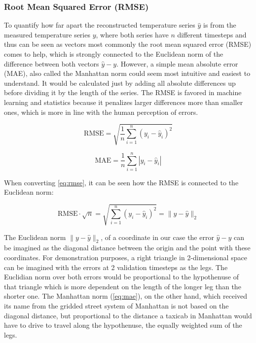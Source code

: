 \subsubsection*{Root Mean Squared Error (RMSE)}

To quantify how far apart the reconstructed temperature series $\hat{y}$ is from the measured temperature series $y$, where both series have $n$ different timesteps and thus can be seen as vectors most commonly the root mean squared error (RMSE) comes to help, which is strongly connected to the Euclidean norm of the difference between both vectors $\hat{y} - y$. However, a simple mean absolute error (MAE), also called the Manhattan norm could seem most intuitive and easiest to understand. It would be calculated just by adding all absolute differences up before dividing it by the length of the series. The RMSE is favored in machine learning and statistics because it penalizes larger differences more than smaller ones, which is more in line with the human perception of errors. 

\begin{equation}
    \text{RMSE} = \sqrt{\frac{1}{n} \sum_{i=1}^{n} (y_i - \hat{y}_i)^2}
    \label{eq:rmse}
\end{equation}

\begin{equation}
    \text{MAE} = \frac{1}{n} \sum_{i=1}^{n} |y_i - \hat{y}_i|
    \label{eq:mae}
\end{equation}

When converting \autoref*{eq:rmse}, it can be seen how the RMSE is connected to the Euclidean norm:

\begin{equation}
  \text{RMSE} \cdot \sqrt{n} = \sqrt{\sum_{i=1}^{n} (y_i - \hat{y}_i)^2} = \| y - \hat{y} \|_2  
  \label{eq:rmse_euclid}
\end{equation}

The Euclidean norm $\| y - \hat{y} \|_2$, of a coordinate in our case the error $\hat{y} - y$ can be imagined as the diagonal distance between the origin and the point with these coordinates. For demonstration purposes, a right triangle in 2-dimensional space can be imagined with the errors at 2 validation timesteps as the legs. The Euclidian norm over both errors would be proportional to the hypothenuse of that triangle which is more dependent on the length of the longer leg than the shorter one. The Manhattan norm (\autoref{eq:mae}), on the other hand, which received its name from the gridded street system of Manhattan is not based on the diagonal distance, but proportional to the distance a taxicab in Manhattan would have to drive to travel along the hypothenuse, the equally weighted sum of the legs.

